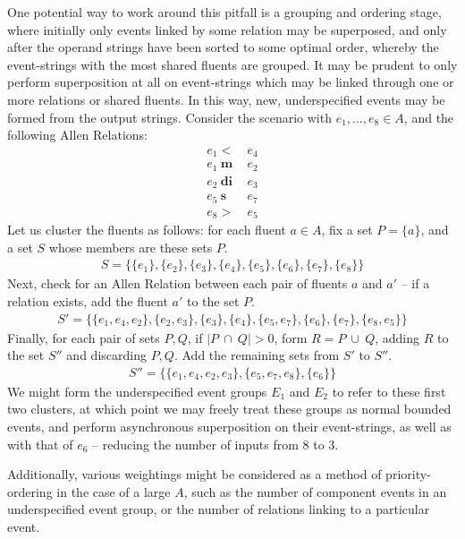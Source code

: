\documentclass[a4paper,11pt,leqno]{article}
\begin{document}
One potential way to work around this pitfall is a grouping and ordering stage, 
where initially only events linked by some relation may be superposed, and only 
after the operand strings have been sorted to some optimal order, whereby the 
event-strings with the most shared fluents are grouped. It may be 
prudent to only perform superposition at all on event-strings which may be 
linked through one or more relations or shared fluents. In this way, new, 
underspecified events may be formed from the output strings. Consider the 
scenario with $e_1, \ldots, e_8 \in A$, and the following Allen 
Relations:
\begin{align*}
e_1 <& ~e_4\\
e_1 ~\mathbf{m}& ~e_2\\
e_2 ~\mathbf{di}& ~e_3\\
e_5 ~\mathbf{s}& ~e_7\\
e_8 >& ~e_5
\end{align*} 
Let us cluster the fluents as follows: for each fluent $a \in A$, fix a set $P 
= \{ a \}$, and a set $S$ whose members are these sets $P$.
\begin{align}
S = \{\{e_1\},\{e_2\},\{e_3\},\{e_4\},\{e_5\},\{e_6\},\{e_7\},\{e_8\}\}
\end{align}
Next, check for an Allen Relation between each pair of fluents $a$ and $a'$ -- 
if 
a relation exists, add the fluent $a'$ to the set $P$.
\begin{align}
S' = \{\{e_1, e_4, e_2\},\{e_2, e_3\}, \{e_3\}, \{e_4\}, \{e_5, e_7\}, \{e_6\}, 
\{e_7\}, \{e_8, e_5\}\}
\end{align}
Finally, for each pair of sets $P, Q$, if $|P ~\cap~ Q| > 0$, form $R = P ~\cup~
Q$, adding $R$ to the set $S''$ and discarding $P, Q$. Add the remaining sets 
from $S'$ to $S''$.
\begin{align}
S'' = \{\{e_1, e_4, e_2, e_3\}, \{e_5, e_7, e_8\}, \{e_6\}\}
\end{align}
We might form the underspecified event groups $E_1$ and 
$E_2$ to refer to these first two clusters, at which point we may freely treat 
these groups as normal bounded events, and perform asynchronous superposition 
on their event-strings, as well as with that of $e_6$ -- reducing the 
number of inputs from 8 to 3.

Additionally, various weightings might be considered as a method of 
priority-ordering in the case of a large $A$, such as the number of 
component events in an underspecified event group, or the number of relations 
linking to a particular event.
\end{document}
